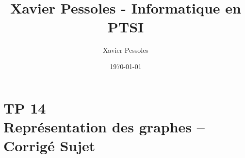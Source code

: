 \documentclass[
	fontsize=10pt, %
	twoside=true, %
]{kaobook}
\newcommand{\repRel}{../../../..}
\newcommand{\repStyle}{\repRel/Style}
\begin{document}

\titlehead{Xavier Pessoles - Informatique en PTSI}
\title[Xavier Pessoles - Informatique en PTSI]{Xavier Pessoles - Informatique en PTSI}
\author[XP]{Xavier Pessoles}
\date{\today}


\begingroup %
\endgroup

%
\mainmatter %
%
%
%
%


\setcounter{margintocdepth}{\sectiontocdepth}
\marginlayout
\graphicspath{{\repStyle/png}}

\pagestyle{xp.scrheadings}


%



\newcommand{\repExo}{}
\newcommand{\nomExo}{}

\livrettrue %
\livrettrue
\colletrue








\chapter*{TP 14 \\ 
Représentation des graphes -- \ifprof Corrigé \else Sujet \fi}
\end{document}
